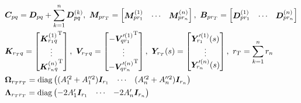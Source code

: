 \begin{displaymath}
  \begin{aligned}
     & \boldsymbol{C}_{pq}=\boldsymbol{D}_{pq}+\sum_{k=1}^{n}{\boldsymbol{D}_{pq}^{(k)}} ,\
    \boldsymbol{M}_{pr_T}=\left[ \begin{matrix}
        \boldsymbol{M}_{pr_1}^{(1)} & \cdots & \boldsymbol{M}_{pr_n}^{(n)}
      \end{matrix} \right] ,\
    \boldsymbol{B}_{pr_T}=\left[ \begin{matrix}
        \boldsymbol{D}_{pr_1}^{(1)} & \cdots & \boldsymbol{D}_{pr_n}^{(n)}
      \end{matrix} \right]                         \\
     & \boldsymbol{K}_{r_Tq}=\left[ \begin{matrix}
        {\boldsymbol{K}_{r_1q}^{(1)}}^{\mathrm{T}} \\
        \vdots                              \\
        {\boldsymbol{K}_{r_nq}^{(n)}}^{\mathrm{T}}
      \end{matrix} \right], \
    \boldsymbol{V}_{r_Tq}=\left[ \begin{matrix}
        -{\boldsymbol{V}_{qr_1}^{\prime(1)}}^{\mathrm{T}} \\
        \vdots                                     \\
        -{\boldsymbol{V}_{qr_n}^{\prime(n)}}^{\mathrm{T}}
      \end{matrix} \right], \
    \boldsymbol{Y}_{r_T}(s)=\left[ \begin{matrix}
        \boldsymbol{Y}_{r_1}^{\prime(1)}(s) \\
        \vdots                              \\
        \boldsymbol{Y}_{r_n}^{\prime(n)}(s)
      \end{matrix} \right],\
    r_T= \sum_{k=1}^n r_n                                                                   \\
     & \boldsymbol{\Omega}_{r_Tr_T}=\operatorname{diag} \left(
    \begin{matrix}
        ({A}_{1}^{\prime 2}+{A}^{\prime\prime 2}_{1}) \boldsymbol{I}_{r_1} & \cdots & ({A}_{n}^{\prime 2}+{A}_{n}^{\prime\prime 2})\boldsymbol{I}_{r_n}
      \end{matrix}
    \right)                                                                                 \\
     & \boldsymbol{\Lambda}_{r_Tr_T}=\operatorname{diag}\left(
    \begin{matrix}
        -2A'_{1}\boldsymbol{I}_{r_1} & \cdots & -2{A'_{n}}\boldsymbol{I}_{r_n}
      \end{matrix}
    \right)
  \end{aligned}
\end{displaymath}

